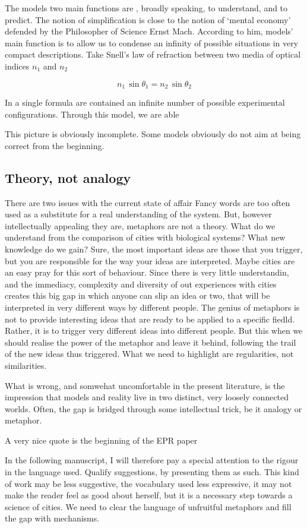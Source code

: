 The models two main functions are , broadly speaking, to understand, and to
predict.  The notion of simplification is close to the notion of `mental
economy' defended by the Philosopher of Science Ernst Mach.  According to him,
models' main function is to allow us to condense an infinity of possible
situations in very compact descriptions. Take Snell's law of refraction between
two media of optical indices $n_1$ and $n_2$

\begin{equation}
    n_1\,\sin \theta_1 = n_2\,\sin \theta_2
\end{equation}

In a single formula are contained an infinite number of possible experimental
configurations. Through this model, we are able

This picture is obviously incomplete. Some models obviously do not aim at being
correct from the beginning.

\subsection{Theory, not analogy}
\label{sub:theory_not_analogy}




There are two issues with the current state of affair 
Fancy words are too often used as a substitute for a real
understanding of the system. But, however intellectually appealing they are,
metaphors are not a theory. What do we understand from the comparison of cities
with biological systems? What new knowledge do we gain? Sure, the most important
ideas are those that you trigger, but you are responsible for the way your ideas
are interpreted.  Maybe cities are an easy pray for this sort of behaviour.
Since there is very little understandin, and the immediacy, complexity and
diversity of out experiences with cities creates this big gap in which anyone
can slip an idea or two, that will be interpreted in very different ways by
different people. The genius of metaphors is not to provide interesting ideas
that are ready to be applied to a specific fiedld. Rather, it is to trigger very
different ideas into different people. But this when we should realise the power
of the metaphor and leave it behind, following the trail of the new ideas thus
triggered. What we need to highlight are regularities, not similarities.

What is wrong, and somwehat uncomfortable in the present literature, is the
impression that models and reality live in two distinct, very loosely connected
worlds. Often, the gap is bridged through some intellectual trick, be it analogy
or metaphor.

A very nice quote is the beginning of the EPR paper

In the following manuscript, I will therefore pay a special attention to the
rigour in the language used. Qualify suggestions, by presenting them as such.
This kind of work may be less suggestive, the vocabulary used less expressive,
it may not make the reader feel as good about herself, but it is a necessary
step towards a science of cities. We need to clear the language of unfruitful
metaphors and fill the gap with mechanisms.
